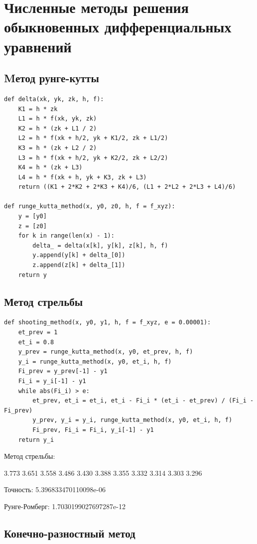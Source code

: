 \documentclass[pdf, unicode, 12pt, a4paper,oneside,fleqn]{article}
\begin{document}
\section{Численные методы решения обыкновенных дифференциальных уравнений}

\subsection{Mетод рунге-кутты}

\begin{lstlisting}
def delta(xk, yk, zk, h, f):
    K1 = h * zk
    L1 = h * f(xk, yk, zk)
    K2 = h * (zk + L1 / 2)
    L2 = h * f(xk + h/2, yk + K1/2, zk + L1/2)
    K3 = h * (zk + L2 / 2)
    L3 = h * f(xk + h/2, yk + K2/2, zk + L2/2)
    K4 = h * (zk + L3)
    L4 = h * f(xk + h, yk + K3, zk + L3)
    return ((K1 + 2*K2 + 2*K3 + K4)/6, (L1 + 2*L2 + 2*L3 + L4)/6)
    
def runge_kutta_method(x, y0, z0, h, f = f_xyz):
    y = [y0]
    z = [z0]
    for k in range(len(x) - 1):
        delta_ = delta(x[k], y[k], z[k], h, f)
        y.append(y[k] + delta_[0])
        z.append(z[k] + delta_[1])
    return y
\end{lstlisting}

\subsection{Метод стрельбы}

\begin{lstlisting}
def shooting_method(x, y0, y1, h, f = f_xyz, e = 0.00001):
    et_prev = 1
    et_i = 0.8
    y_prev = runge_kutta_method(x, y0, et_prev, h, f)
    y_i = runge_kutta_method(x, y0, et_i, h, f)
    Fi_prev = y_prev[-1] - y1
    Fi_i = y_i[-1] - y1
    while abs(Fi_i) > e:
        et_prev, et_i = et_i, et_i - Fi_i * (et_i - et_prev) / (Fi_i - Fi_prev)
        y_prev, y_i = y_i, runge_kutta_method(x, y0, et_i, h, f)
        Fi_prev, Fi_i = Fi_i, y_i[-1] - y1
    return y_i
\end{lstlisting}

Метод стрельбы:

3.773 3.651 3.558 3.486 3.430 3.388 3.355 3.332 3.314 3.303 3.296 

Точность: 5.396833470110098e-06

Рунге-Ромберг: 1.7030199027697287e-12

\subsection{Конечно-разностный метод}
\end{document}
